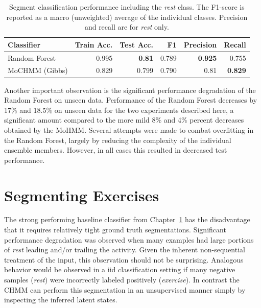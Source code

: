 \documentclass[12pt]{report}
\newcommand{\1}[0]{\mathbbm{1}}
\begin{document}
\begin{table}[ht]
    \centering
    \begin{tabular}{l r r r r r}\hline
    \textbf{Classifier} & \textbf{Train Acc.} & \textbf{Test Acc.} & \textbf{F1}    & \textbf{Precision} & \textbf{Recall} \\\hline
    Random Forest       & 0.995               & \textbf{0.81}      & 0.789          & \textbf{0.925}     & 0.755 \\
    MoCHMM (Gibbs)       & 0.829               & 0.799              & 0.790          & 0.81               & \textbf{0.829} \\
    \end{tabular}
    \caption[Performance on the segmented exercise task with \emph{rest}]{
        Segment classification performance including the \emph{rest} class.
        The F1-score is reported as a macro (unweighted) average of the individual classes.
        Precision and recall are for \emph{rest} only.
    }
    \label{table:segment-results-rest}
\end{table}

Another important observation is the significant performance degradation of the Random Forest
on unseen data. Performance of the Random Forest decreases by 17\% and 18.5\% on unseen data
for the two experiments described here, a significant amount compared to the more mild 8\% and 4\%
percent decreases obtained by the \ac{MoHMM}. Several attempts were made to combat overfitting in
the Random Forest, largely by reducing the complexity of the individual ensemble members. However,
in all cases this resulted in decreased test performance.


\chapter{Segmenting Exercises}
\label{chap:Segmenting Exercises}
The strong performing baseline classifier from Chapter~\ref{chap:Segmenting Exercises} has the disadvantage
that it requires relatively tight ground truth segmentations. Significant performance degradation
was observed when many examples had large portions of \emph{rest} leading and/or trailing the activity.
Given the inherent non-sequential treatment of the input, this observation should not be surprising.
Analogous behavior would be observed in a \ac{iid} classification setting if many
negative samples (\emph{rest}) were incorrectly labeled positively (\emph{exercise}).
In contrast the \ac{CHMM} can perform this segmentation in an unsupervised manner simply by inspecting the
inferred latent states.
\end{document}
